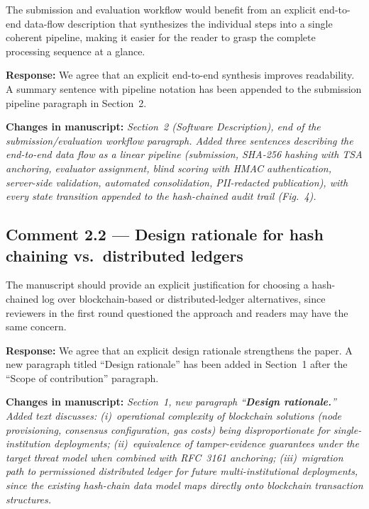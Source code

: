 \documentclass[11pt,a4paper]{article}
\newcommand{\response}[1]{\par\noindent\textcolor{responsecolor}{\textbf{Response:}} #1}
\newcommand{\change}[1]{\par\noindent\textcolor{changecolor}{\textbf{Changes in manuscript:}} \textit{#1}}
\begin{document}
\begin{reviewerbox}
The submission and evaluation workflow would benefit from an explicit end-to-end data-flow description that synthesizes the individual steps into a single coherent pipeline, making it easier for the reader to grasp the complete processing sequence at a glance.
\end{reviewerbox}

\response{We agree that an explicit end-to-end synthesis improves readability. A summary sentence with pipeline notation has been appended to the submission pipeline paragraph in Section~2.}

\change{Section~2 (Software Description), end of the submission/evaluation workflow paragraph. Added three sentences describing the end-to-end data flow as a linear pipeline (submission, SHA-256 hashing with TSA anchoring, evaluator assignment, blind scoring with HMAC authentication, server-side validation, automated consolidation, PII-redacted publication), with every state transition appended to the hash-chained audit trail (Fig.~4).}

\bigskip

\subsection*{Comment 2.2 --- Design rationale for hash chaining vs.\ distributed ledgers}

\begin{reviewerbox}
The manuscript should provide an explicit justification for choosing a hash-chained log over blockchain-based or distributed-ledger alternatives, since reviewers in the first round questioned the approach and readers may have the same concern.
\end{reviewerbox}

\response{We agree that an explicit design rationale strengthens the paper. A new paragraph titled ``Design rationale'' has been added in Section~1 after the ``Scope of contribution'' paragraph.}

\change{Section~1, new paragraph ``\textbf{Design rationale.}'' Added text discusses: (i)~operational complexity of blockchain solutions (node provisioning, consensus configuration, gas costs) being disproportionate for single-institution deployments; (ii)~equivalence of tamper-evidence guarantees under the target threat model when combined with RFC~3161 anchoring; (iii)~migration path to permissioned distributed ledger for future multi-institutional deployments, since the existing hash-chain data model maps directly onto blockchain transaction structures.}
\end{document}
